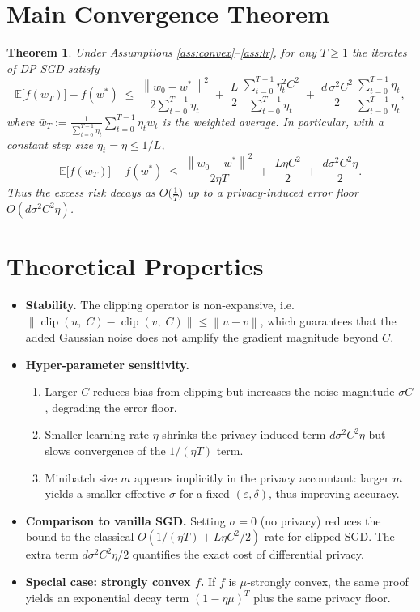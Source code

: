 \documentclass[11pt]{article}
\newtheorem{theorem}{Theorem}
\newcommand{\E}{\mathbb{E}}
\newcommand{\norm}[1]{\left\|#1\right\|}
\newcommand{\clip}[2]{\operatorname{clip}\!\left(#1,\;#2\right)}
\begin{document}
\section*{Main Convergence Theorem}
\begin{theorem}\label{thm:dp-sgd}
Under Assumptions \ref{ass:convex}–\ref{ass:lr}, for any $T\ge 1$ the iterates of DP‑SGD satisfy
\[
\E\!\bigl[f(\bar w_{T})\bigr]-f(w^{*})
\;\le\;
\frac{\norm{w_{0}-w^{*}}^{2}}{2\sum_{t=0}^{T-1}\eta_{t}}
\;+\;
\frac{L}{2}\,\frac{\sum_{t=0}^{T-1}\eta_{t}^{2}C^{2}}{\sum_{t=0}^{T-1}\eta_{t}}
\;+\;
\frac{d\,\sigma^{2}C^{2}}{2}\,\frac{\sum_{t=0}^{T-1}\eta_{t}}{\sum_{t=0}^{T-1}\eta_{t}},
\]
where $\bar w_{T}:=\frac{1}{\sum_{t=0}^{T-1}\eta_{t}}\sum_{t=0}^{T-1}\eta_{t}w_{t}$ is the weighted average.
In particular, with a constant step size $\eta_{t}=\eta\le 1/L$,
\[
\E\!\bigl[f(\bar w_{T})\bigr]-f(w^{*})
\;\le\;
\frac{\norm{w_{0}-w^{*}}^{2}}{2\eta T}
\;+\;
\frac{L\eta C^{2}}{2}
\;+\;
\frac{d\sigma^{2}C^{2}\eta}{2}.
\]
Thus the excess risk decays as $O\!\bigl(\tfrac{1}{T}\bigr)$ up to a privacy‑induced error floor $O(d\sigma^{2}C^{2}\eta)$.
\end{theorem}

\section*{Theoretical Properties}
\begin{itemize}[leftmargin=*]
\item \textbf{Stability.} The clipping operator is non‑expansive, i.e. $\norm{\clip{u}{C}-\clip{v}{C}}\le \norm{u-v}$, which guarantees that the added Gaussian noise does not amplify the gradient magnitude beyond $C$.
\item \textbf{Hyper‑parameter sensitivity.}
    \begin{enumerate}
        \item Larger $C$ reduces bias from clipping but increases the noise magnitude $ \sigma C$, degrading the error floor.
        \item Smaller learning rate $\eta$ shrinks the privacy‑induced term $d\sigma^{2}C^{2}\eta$ but slows convergence of the $1/(\eta T)$ term.
        \item Minibatch size $m$ appears implicitly in the privacy accountant: larger $m$ yields a smaller effective $\sigma$ for a fixed $(\varepsilon,\delta)$, thus improving accuracy.
    \end{enumerate}
\item \textbf{Comparison to vanilla SGD.} Setting $\sigma=0$ (no privacy) reduces the bound to the classical $O(1/(\eta T)+L\eta C^{2}/2)$ rate for clipped SGD. The extra term $d\sigma^{2}C^{2}\eta/2$ quantifies the exact cost of differential privacy.
\item \textbf{Special case: strongly convex $f$.} If $f$ is $\mu$‑strongly convex, the same proof yields an exponential decay term $ (1-\eta\mu)^{T}$ plus the same privacy floor.
\end{itemize}
\end{document}
